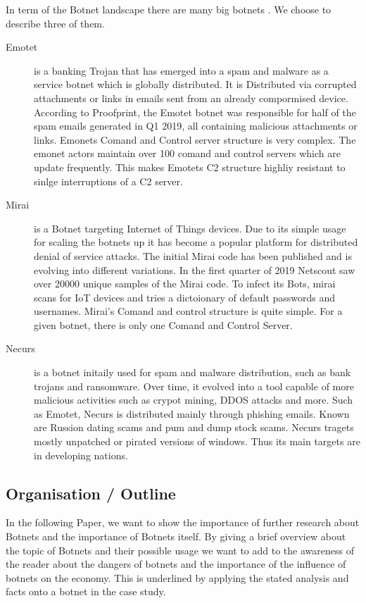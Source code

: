 In term of the Botnet landscape there are many big botnets \cite{CenturyLink19}. We choose to describe three of them. 
\begin{description}
\item[Emotet] is a banking Trojan that has emerged into a spam and malware as a service botnet which is globally distributed. It is Distributed via corrupted attachments or links in emails sent from an already compormised device. According to Proofprint, the Emotet botnet was responsible for half of the spam emails generated in Q1 2019, all containing malicious attachments or links. Emonets Comand and Control server structure is very complex. The emonet actors maintain over 100 comand and control servers which are update frequently. This makes Emotets C2 structure highliy resistant to sinlge interruptions of a C2 server.\cite{CenturyLink19}

\item[Mirai] is a Botnet targeting Internet of Things devices. Due to its simple usage for scaling the botnets up it has become a popular platform for distributed denial of service attacks. The initial Mirai code has been published and is evolving into different variations. In the first quarter of 2019 Netscout saw over 20000 unique samples of the Mirai code. \cite{Netscout19}
To infect its Bots, mirai scans for IoT devices and tries a dictoionary of default passwords and usernames. Mirai's Comand and control structure is quite simple. For a given botnet, there is only one Comand and Control Server. \cite{CenturyLink19}

\item[Necurs] is a botnet initaily used for spam and malware distribution, such as bank trojans and ransomware. Over time, it evolved into a tool capable of more malicious activities such as crypot mining, DDOS attacks and more. Such as Emotet, Necurs is distributed mainly through phishing emails. Known are Russion dating scams and pum and dump stock scams. Necurs tragets mostly unpatched or pirated versions of windows. Thus its main targets are in developing nations. \cite{CenturyLink19}

\end{description}
 


 
\subsection{Organisation / Outline}
In the following Paper, we want to show the importance of further research about Botnets and the importance of Botnets itself. By giving a brief overview about the topic of Botnets and their possible usage we want to add to the awareness of the reader about the dangers of botnets and the importance of the influence of botnets on the economy. This is underlined by applying the stated analysis and facts onto a botnet in the case study. 


